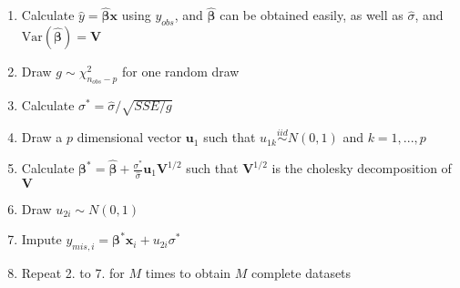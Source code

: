 \documentclass[preprint,12pt]{elsarticle}
\begin{document}
\begin{enumerate} 
    \item Calculate $\hat{y}=\hat{\boldsymbol{\beta}}\mathbf{x}$ using $y_{obs}$, and $\hat{\boldsymbol{\beta}}$ can be obtained easily, as well as $\hat{\sigma}$, and $\text{Var}(\hat{\boldsymbol{\beta}})=\mathbf{V}$
    \item Draw $g\sim \chi^2_{n_{obs}-p}$ for one random draw 
    \item Calculate $\sigma^*=\hat{\sigma}/\sqrt{SSE/g}$
    \item Draw a $p$ dimensional vector $\mathbf{u}_1$ such that $u_{1k}\stackrel{iid}{\sim} N(0,1)$ and $k=1,...,p$
    \item Calculate $\boldsymbol{\beta}^*=\hat{\boldsymbol{\beta}}+\frac{\sigma^*}{\hat{\sigma}}\mathbf{u}_1\mathbf{V}^{1/2}$ such that $\mathbf{V}^{1/2}$ is the cholesky decomposition of $\mathbf{V}$
    \item Draw $u_{2i}\sim N(0,1)$ 
    \item Impute $y_{mis,i}=\boldsymbol{\beta}^*\mathbf{x}_i+u_{2i}\sigma^*$ 
    \item Repeat 2. to 7. for $M$ times to obtain $M$ complete datasets
\end{enumerate}
\end{document}
